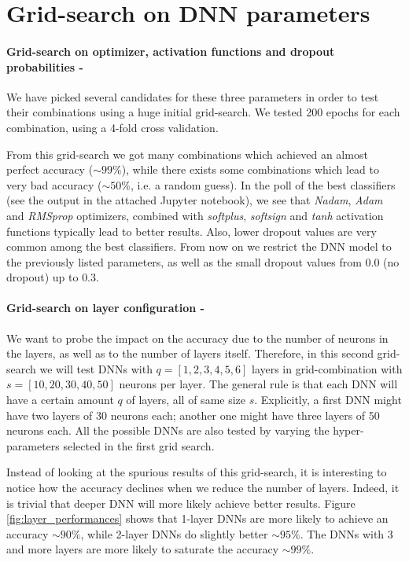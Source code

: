\section{Grid-search on DNN parameters}
\label{sec:gridsearches}

\paragraph{\textbf{Grid-search on optimizer, activation functions and dropout probabilities -}}
We have picked several candidates for these three parameters in order to test their combinations using a huge initial grid-search. We tested 200 epochs for each combination, using a 4-fold cross validation.

From this grid-search we got many combinations which achieved an almost perfect accuracy ($\sim 99\%$), while there exists some combinations which lead to very bad accuracy ($\sim 50\%$, i.e. a random guess). In the poll of the best classifiers (see the output in the attached Jupyter notebook), we see that \emph{Nadam}, \emph{Adam} and \emph{RMSprop} optimizers, combined with \emph{softplus}, \emph{softsign} and \emph{tanh} activation functions typically lead to better results. Also, lower dropout values are very common among the best classifiers. From now on we restrict the DNN model to the previously listed parameters, as well as the small dropout values from $0.0$ (no dropout) up to $0.3$.


\paragraph{\textbf{Grid-search on layer configuration - }} We want to probe the impact on the accuracy due to the number of neurons in the layers, as well as to the number of layers itself. Therefore, in this second grid-search we will test DNNs with $q = [1,2,3,4,5,6]$ layers in grid-combination with $s = [10,20,30,40,50]$ neurons per layer. The general rule is that each DNN will have a certain amount $q$ of layers, all of same size $s$. Explicitly, a first DNN might have two layers of 30 neurons each; another one might have three layers of 50 neurons each. All the possible DNNs are also tested by varying the hyper-parameters selected in the first grid search.

Instead of looking at the spurious results of this grid-search, it is interesting to notice how the accuracy declines when we reduce the number of layers. Indeed, it is trivial that deeper DNN will more likely achieve better results. Figure \ref{fig:layer_performances} shows that 1-layer DNNs are more likely to achieve an accuracy $\sim 90\%$, while 2-layer DNNs do slightly better $\sim 95\%$. The DNNs with 3 and more layers are more likely to saturate the accuracy $\sim 99\%$.

